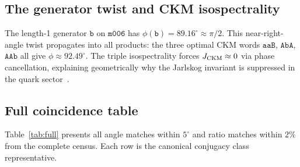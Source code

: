 \documentclass[11pt,a4paper]{article}
\newcommand{\mfld}[1]{\texttt{#1}}
\newcommand{\word}[1]{\texttt{#1}}
\newcommand{\degr}{^{\circ}}
\begin{document}
\subsection{The generator twist and CKM isospectrality}
\label{sec:generator}

The length-1 generator $\word{b}$ on $\mfld{m006}$ has
$\phi(\word{b})=89.16\degr\approx\pi/2$.
This near-right-angle twist propagates into all products: the three optimal
CKM words $\word{aaB}$, $\word{AbA}$, $\word{AAb}$ all give
$\phi\approx 92.49\degr$.
The triple isospectrality forces $J_{\rm CKM}\approx 0$ via phase cancellation,
explaining geometrically why the Jarlskog invariant is suppressed in the
quark sector~\cite{GentryCKM}.

\subsection{Full coincidence table}
\label{sec:full_table}

Table~\ref{tab:full} presents all angle matches within $5\degr$ and ratio
matches within $2\%$ from the complete census.
Each row is the canonical conjugacy class representative.
\end{document}

